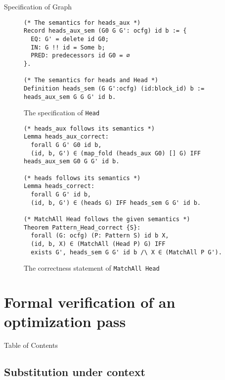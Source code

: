 \documentclass{beamer}
\newcommand{\inlinecoq}[1]{\mbox{\lstinline[style=customcoq,columns=fixed,basewidth=.48em]{#1}}}
\newcommand{\ilc}[1]{\inlinecoq{#1}}
\begin{document}
\begin{frame}[fragile]{Specification of Graph}
  \begin{figure}
    \begin{lstlisting}[style=customcoq,basicstyle=\small\ttfamily]
(* The semantics for heads_aux *)
Record heads_aux_sem (G0 G G': ocfg) id b := {
  EQ: G' = delete id G0;
  IN: G !! id = Some b;
  PRED: predecessors id G0 = ∅
}.

(* The semantics for heads and Head *)
Definition heads_sem (G G':ocfg) (id:block_id) b := heads_aux_sem G G G' id b.
    \end{lstlisting}
    \caption{The specification of \ilc{Head}}
    \label{fig:sem_head_def}
  \end{figure}
\end{frame}

\begin{frame}[fragile]
  \begin{figure}
    \begin{lstlisting}[style=customcoq,basicstyle=\small\ttfamily]
(* heads_aux follows its semantics *)
Lemma heads_aux_correct:
  forall G G' G0 id b,
  (id, b, G') ∈ (map_fold (heads_aux G0) [] G) IFF heads_aux_sem G0 G G' id b.

(* heads follows its semantics *)
Lemma heads_correct:
  forall G G' id b,
  (id, b, G') ∈ (heads G) IFF heads_sem G G' id b.

(* MatchAll Head follows the given semantics *)
Theorem Pattern_Head_correct {S}:
  forall (G: ocfg) (P: Pattern S) id b X,
  (id, b, X) ∈ (MatchAll (Head P) G) IFF
  exists G', heads_sem G G' id b /\ X ∈ (MatchAll P G').
      \end{lstlisting}
    \caption{The correctness statement of \ilc{MatchAll Head}}
    \label{fig:head_cor}
  \end{figure}
\end{frame}

\section{Formal verification of an optimization pass}

\begin{frame}{Table of Contents}
  \tableofcontents[currentsection]
\end{frame}

\subsection*{Substitution under context}
\end{document}
